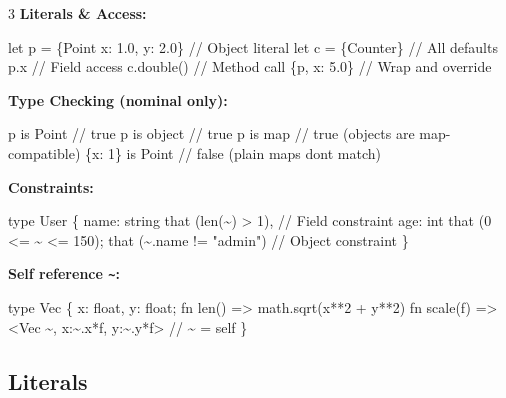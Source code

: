 \documentclass[8pt,landscape,a4paper,oneside]{article}
\newenvironment{Shaded}{%
  \begin{snugshade}%
  \vspace{0.4\baselineskip}%
  \fontsize{9}{10}\selectfont%
  \setlength{\parskip}{0pt}%
  \setlength{\topsep}{0pt}%
  \setlength{\partopsep}{0pt}%
}{%
  \vspace{0.01\baselineskip}%
  \end{snugshade}%
}
\newcommand{\NormalTok}[1]{#1}
\begin{document}
\begin{multicols*}{3}
\textbf{Literals \& Access:}

\begin{Shaded}
\begin{Highlighting}[]
\NormalTok{let p = \{Point x: 1.0, y: 2.0\}   // Object literal}
\NormalTok{let c = \{Counter\}                // All defaults}
\NormalTok{p.x                              // Field access}
\NormalTok{c.double()                       // Method call}
\NormalTok{\{p, x: 5.0\}                      // Wrap and override}
\end{Highlighting}
\end{Shaded}

\textbf{Type Checking (nominal only):}

\begin{Shaded}
\begin{Highlighting}[]
\NormalTok{p is Point     // true}
\NormalTok{p is object    // true}
\NormalTok{p is map       // true (objects are map{-}compatible)}
\NormalTok{\{x: 1\} is Point  // false (plain maps don\textquotesingle{}t match)}
\end{Highlighting}
\end{Shaded}

\textbf{Constraints:}

\begin{Shaded}
\begin{Highlighting}[]
\NormalTok{type User \{}
\NormalTok{  name: string that (len(\textasciitilde{}) \textgreater{} 1),  // Field constraint}
\NormalTok{  age: int that (0 \textless{}= \textasciitilde{} \textless{}= 150);}
\NormalTok{  that (\textasciitilde{}.name != "admin")         // Object constraint}
\NormalTok{\}}
\end{Highlighting}
\end{Shaded}

\textbf{Self reference \texttt{\textasciitilde{}}:}

\begin{Shaded}
\begin{Highlighting}[]
\NormalTok{type Vec \{ }
\NormalTok{  x: float, y: float;}
\NormalTok{  fn len() =\textgreater{} math.sqrt(x**2 + y**2)}
\NormalTok{  fn scale(f) =\textgreater{} \textless{}Vec \textasciitilde{}, x:\textasciitilde{}.x*f, y:\textasciitilde{}.y*f\textgreater{}  // \textasciitilde{} = self}
\NormalTok{\}}
\end{Highlighting}
\end{Shaded}

\subsection{Literals}\label{literals}


\end{multicols*}
\end{document}
